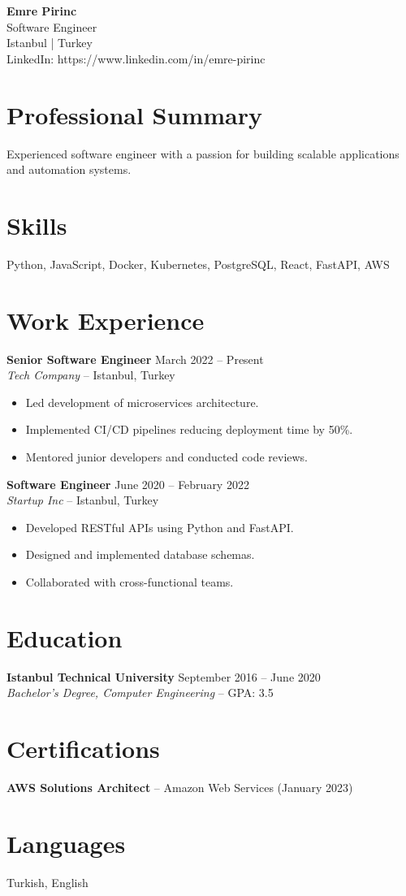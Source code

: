 \documentclass[a4paper,10pt]{article}
\begin{document}
\begin{center}
{\LARGE\bfseries Emre Pirinc}\\[4pt]
Software Engineer\\[2pt]Istanbul | Turkey\\[2pt]
LinkedIn: https://www.linkedin.com/in/emre-pirinc\end{center}

\section{Professional Summary}
Experienced software engineer with a passion for building scalable applications and automation systems.

\section{Skills}
Python, JavaScript, Docker, Kubernetes, PostgreSQL, React, FastAPI, AWS

\section{Work Experience}
\textbf{Senior Software Engineer} \hfill March 2022 -- Present\\
\textit{Tech Company} -- Istanbul, Turkey\begin{itemize}
\item Led development of microservices architecture.
\item Implemented CI/CD pipelines reducing deployment time by 50\%.
\item Mentored junior developers and conducted code reviews.
\end{itemize}
\vspace{4pt}\textbf{Software Engineer} \hfill June 2020 -- February 2022\\
\textit{Startup Inc} -- Istanbul, Turkey\begin{itemize}
\item Developed RESTful APIs using Python and FastAPI.
\item Designed and implemented database schemas.
\item Collaborated with cross-functional teams.
\end{itemize}

\section{Education}
\textbf{Istanbul Technical University} \hfill September 2016 -- June 2020\\
\textit{Bachelor's Degree, Computer Engineering} -- GPA: 3.5
\section{Certifications}
\textbf{AWS Solutions Architect} -- Amazon Web Services (January 2023)\\

\section{Languages}
Turkish, English
\end{document}
